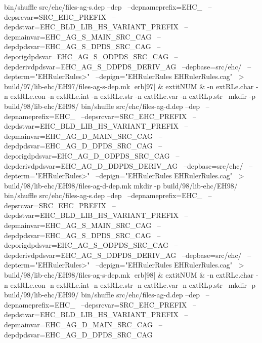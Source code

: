 bin/shuffle src/ehc/files-ag-s.dep --dep \
	  --depnameprefix=EHC_ \
	  --depsrcvar=SRC_EHC_PREFIX \
	  --depdstvar=EHC_BLD_LIB_HS_VARIANT_PREFIX \
	  --depmainvar=EHC_AG_S_MAIN_SRC_CAG \
	  --depdpdsvar=EHC_AG_S_DPDS_SRC_CAG \
	  --deporigdpdsvar=EHC_AG_S_ODPDS_SRC_CAG \
	  --depderivdpdsvar=EHC_AG_S_DDPDS_DERIV_AG \
	  --depbase=src/ehc/ \
	  --depterm="EHRulerRules>" \
	  --depign="EHRulerRules EHRulerRules.cag" \
	    > build/97/lib-ehc/EH97/files-ag-s-dep.mk
erb|97| & 	extit{NUM} & 
-n 	extRL{e.char}\hspace{.5em} 
-n 	extRL{e.con}\hspace{.5em} 
-n 	extRL{e.int}\hspace{.5em} 
-n 	extRL{e.str}\hspace{.5em} 
-n 	extRL{e.var}\hspace{.5em} 
-n 	extRL{p.str}\hspace{.5em} 
\
mkdir -p build/98/lib-ehc/EH98/
bin/shuffle src/ehc/files-ag-d.dep --dep \
	  --depnameprefix=EHC_ \
	  --depsrcvar=SRC_EHC_PREFIX \
	  --depdstvar=EHC_BLD_LIB_HS_VARIANT_PREFIX \
	  --depmainvar=EHC_AG_D_MAIN_SRC_CAG \
	  --depdpdsvar=EHC_AG_D_DPDS_SRC_CAG \
	  --deporigdpdsvar=EHC_AG_D_ODPDS_SRC_CAG \
	  --depderivdpdsvar=EHC_AG_D_DDPDS_DERIV_AG \
	  --depbase=src/ehc/ \
	  --depterm="EHRulerRules>" \
	  --depign="EHRulerRules EHRulerRules.cag" \
	    > build/98/lib-ehc/EH98/files-ag-d-dep.mk
mkdir -p build/98/lib-ehc/EH98/
bin/shuffle src/ehc/files-ag-s.dep --dep \
	  --depnameprefix=EHC_ \
	  --depsrcvar=SRC_EHC_PREFIX \
	  --depdstvar=EHC_BLD_LIB_HS_VARIANT_PREFIX \
	  --depmainvar=EHC_AG_S_MAIN_SRC_CAG \
	  --depdpdsvar=EHC_AG_S_DPDS_SRC_CAG \
	  --deporigdpdsvar=EHC_AG_S_ODPDS_SRC_CAG \
	  --depderivdpdsvar=EHC_AG_S_DDPDS_DERIV_AG \
	  --depbase=src/ehc/ \
	  --depterm="EHRulerRules>" \
	  --depign="EHRulerRules EHRulerRules.cag" \
	    > build/98/lib-ehc/EH98/files-ag-s-dep.mk
erb|98| & 	extit{NUM} & 
-n 	extRL{e.char}\hspace{.5em} 
-n 	extRL{e.con}\hspace{.5em} 
-n 	extRL{e.int}\hspace{.5em} 
-n 	extRL{e.str}\hspace{.5em} 
-n 	extRL{e.var}\hspace{.5em} 
-n 	extRL{p.str}\hspace{.5em} 
\
mkdir -p build/99/lib-ehc/EH99/
bin/shuffle src/ehc/files-ag-d.dep --dep \
	  --depnameprefix=EHC_ \
	  --depsrcvar=SRC_EHC_PREFIX \
	  --depdstvar=EHC_BLD_LIB_HS_VARIANT_PREFIX \
	  --depmainvar=EHC_AG_D_MAIN_SRC_CAG \
	  --depdpdsvar=EHC_AG_D_DPDS_SRC_CAG \
